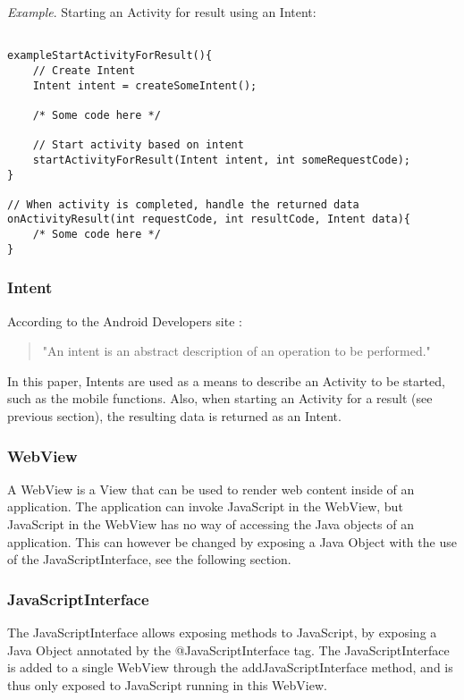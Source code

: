 \emph{Example}. Starting an Activity for result using an Intent:
\begin{lstlisting}

exampleStartActivityForResult(){
	// Create Intent
	Intent intent = createSomeIntent();
	
	/* Some code here */
	
	// Start activity based on intent
	startActivityForResult(Intent intent, int someRequestCode);
}

// When activity is completed, handle the returned data
onActivityResult(int requestCode, int resultCode, Intent data){
	/* Some code here */
}
\end{lstlisting}

\subsubsection{Intent}\label{subsubsec:intent}
According to the Android Developers site \cite{intent2015}:
\begin{quotation}
"An intent is an abstract description of an operation to be performed."
\end{quotation}
In this paper, Intents are used as a means to describe an Activity to be started, such as the mobile functions. Also, when starting an Activity for a result (see previous section), the resulting data is returned as an Intent. 

\subsubsection{WebView}\label{subsubsec:webview}
A WebView \cite{webview2015} is a View \cite{view2015} that can be used to render web content inside of an application. The application can invoke JavaScript in the WebView, but JavaScript in the WebView has no way of accessing the Java objects of an application. This can however be changed by exposing a Java Object with the use of the JavaScriptInterface, see the following section.

\subsubsection{JavaScriptInterface}\label{subsubsec:javascriptinterface}
The JavaScriptInterface \cite{jsi2015} allows exposing methods to JavaScript, by exposing a Java Object annotated by the @JavaScriptInterface tag. The JavaScriptInterface is added to a single WebView through the addJavaScriptInterface method, and is thus only exposed to JavaScript running in this WebView.

